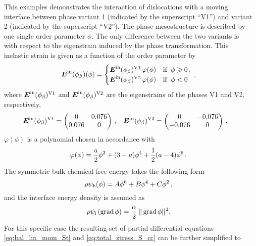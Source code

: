 \documentclass[preprint,review,3p,times,authoryear]{elsarticle}
\begin{document}
This examples demonstrates the interaction of dislocations with a moving interface between phase variant 1 (indicated by the superscript ``V1'') and variant 2 (indicated by the superscript ``V2''). The phase mesostructure is described by one single order parameter $\phi$. The only difference between the two variants is with respect to the eigenstrain induced by the phase transformation.  This inelastic strain is given as a function of the order parameter by
\begin{equation}
  \label{eq:in-ex}
  \boldsymbol{E}^{\text{in}}(\phi_{\beta})(\phi) =
  \begin{cases}
    \boldsymbol{E}^{\text{in}}(\phi_{\beta})^{\text{V1}}\,\varphi(\phi) & \textrm{if}\;\;\phi \geqslant 0\,,\\
    \boldsymbol{E}^{\text{in}}(\phi_{\beta})^{\text{V2}}\,\varphi(\phi) & \textrm{if}\;\;\phi < 0\\
  \end{cases}\,,
\end{equation}
where $\boldsymbol{E}^{\text{in}}(\phi_{\beta})^{\text{V1}}$ and $\boldsymbol{E}^{\text{in}}(\phi_{\beta})^{\text{V2}}$ are the eigenstrains of the phases V1 and V2, respectively,
\begin{align}
  \label{eq:eig-ex}
  & \boldsymbol{E}^{\text{in}}(\phi_{\beta})^{\text{V1}} =
    \left(
    \begin{matrix}
      0 & 0.076 \\
      0.076 & 0
    \end{matrix}
            \right)\,,
        && \boldsymbol{E}^{\text{in}}(\phi_{\beta})^{\text{V2}} =
           \left(
           \begin{matrix}
             0 & -0.076 \\
             -0.076 & 0
           \end{matrix}
                   \right)\,.
\end{align}
$\varphi(\phi)$ is a polynomial chosen in accordance with \cite{Levitas:2002xy}
\begin{equation}
  \label{eq:phi6}
  \varphi(\phi) = \frac{a}{2}\phi^{2} + (3-a)\phi^4 + \frac{1}{2}(a-4)\phi^6\,.
\end{equation}
The symmetric bulk chemical free energy takes the following form
\begin{equation}
  \label{eq:bulk-chem-ex}
  \rho\psi_{\text{b}}(\phi) = A\phi^{6} + B\phi^{4} + C\phi^{2}\,,
\end{equation}
and the interface energy density is assumed as
\begin{equation}
  \label{eq:interface_en_dens}
  \rho\psi_{\text{i}}\left( \operatorname*{grad}\phi \right) = \frac{\alpha}{2}\, || \operatorname*{grad}\phi ||^{2}.
\end{equation}
For this specific case the resulting set of partial differential equations \eqref{eq:bal_lin_mom_St} and  \eqref{eq:total_stress_S_cc} can be further simplified to
\end{document}
